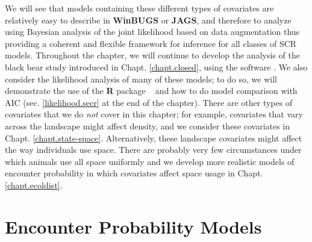 We will see that models containing these different types of
covariates are relatively easy to describe in {\bf WinBUGS} or
{\bf JAGS}, and
therefore to analyze using Bayesian analysis of the joint likelihood
based on data augmentation thus providing a coherent and flexible
framework for inference for all classes of SCR models.  Throughout the
chapter, we will continue to develop the analysis of the black bear
study introduced in Chapt. \ref{chapt.closed}, using the software
\jags.  We also
consider the likelihood analysis of many of these models; to do so, we
will demonstrate the use of the {\bf R} package \secr~ and how to do model
comparison with AIC (sec. \ref{likelihood.secr} at the end of the chapter).
There are other types of covariates that we do {\it not} cover in this
chapter; for example, covariates that vary across the
landscape might affect density, and we consider these covariates in
Chapt. \ref{chapt.state-space}.
Alternatively, these landscape covariates might affect the way individuals use
space. There are probably very few circumstances under which animals use all 
space uniformly and we develop more realistic models of encounter
probability in which covariates affect space usage in Chapt. \ref{chapt.ecoldist}.


\section{Encounter Probability Models}
\label{covs.sec.detfunc}

